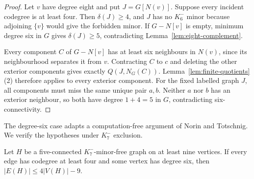 \begin{proof}
Let $v$ have degree eight and put $J=G[N(v)]$.  Suppose every incident
codegree is at least four.  Then $\delta(J)\geq4$, and $J$ has no
$K_6^{-}$ minor because adjoining $\{v\}$ would give the forbidden
minor.  If $G-N[v]$ is empty, minimum degree six in $G$ gives
$\delta(J)\geq5$, contradicting Lemma~\ref{lem:eight-complement}.

Every component $C$ of $G-N[v]$ has at least six neighbours in $N(v)$,
since its neighbourhood separates it from $v$.  Contracting $C$ to $c$
and deleting the other exterior components gives exactly
$Q(J,N_G(C))$.  Lemma~\ref{lem:finite-quotients}(2) therefore applies to
every exterior component.  For the fixed labelled graph $J$, all
components must miss the same unique pair $a,b$.  Neither $a$ nor $b$
has an exterior neighbour, so both have degree $1+4=5$ in $G$,
contradicting six-connectivity.
\end{proof}

The degree-six case adapts a computation-free argument of Norin and
Totschnig.  We verify the hypotheses under $K_7^{-}$ exclusion.

\begin{lemma}\label{lem:degree-six}
Let $H$ be a five-connected $K_7^{-}$-minor-free graph on at least nine
vertices.  If every edge has codegree at least four and some vertex has
degree six, then $|E(H)|\leq4|V(H)|-9$.
\end{lemma}

